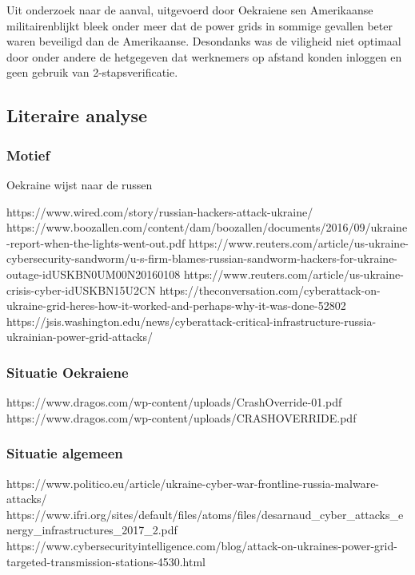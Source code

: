 Uit onderzoek\cite{zetter2016GridHack} naar de aanval,  uitgevoerd door Oekraiene sen Amerikaanse militairenblijkt  bleek onder meer dat de power grids in sommige gevallen beter waren beveiligd dan de Amerikaanse. Desondanks was de viligheid niet optimaal door onder andere de  hetgegeven dat werknemers op afstand konden inloggen en geen gebruik van 2-stapsverificatie.


\subsection{Literaire analyse}

\subsubsection{Motief}
Oekraine wijst naar de russen \cite{zetter2016GridHack}

https://www.wired.com/story/russian-hackers-attack-ukraine/
\cite{greenberg2017Cyberwartestlab}
https://www.boozallen.com/content/dam/boozallen/documents/2016/09/ukraine-report-when-the-lights-went-out.pdf
\cite{boozallen2016lightwentout}
https://www.reuters.com/article/us-ukraine-cybersecurity-sandworm/u-s-firm-blames-russian-sandworm-hackers-for-ukraine-outage-idUSKBN0UM00N20160108
\cite{finkle08012016russiansandwormhackers}
https://www.reuters.com/article/us-ukraine-crisis-cyber-idUSKBN15U2CN
\cite{zinets15022017ukrainechargesrussia}
https://theconversation.com/cyberattack-on-ukraine-grid-heres-how-it-worked-and-perhaps-why-it-was-done-52802
\cite{mcelfresh2016cyberattackhowandwhy}
https://jsis.washington.edu/news/cyberattack-critical-infrastructure-russia-ukrainian-power-grid-attacks/
\cite{parkwalstorm11102017russiagridattack}
\subsubsection{Situatie Oekraiene}
https://www.dragos.com/wp-content/uploads/CrashOverride-01.pdf
\cite{drago2017CrashOverride}
https://www.dragos.com/wp-content/uploads/CRASHOVERRIDE.pdf
\cite{slowik2019ReassasUkraine2016Attack}
\subsubsection{Situatie algemeen}
https://www.politico.eu/article/ukraine-cyber-war-frontline-russia-malware-attacks/
\cite{cerulus2019FrontlineRussiaAttack}
https://www.ifri.org/sites/default/files/atoms/files/desarnaud_cyber_attacks_energy_infrastructures_2017_2.pdf
\cite{desarnaud2017cyberattacks}
https://www.cybersecurityintelligence.com/blog/attack-on-ukraines-power-grid-targeted-transmission-stations-4530.html
\cite{dragos2019TargetedTransStation}
